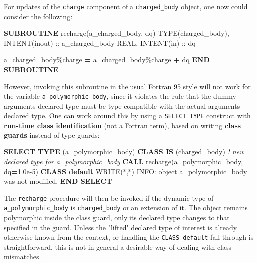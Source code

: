 \documentclass[
]{scrartcl}
\newenvironment{Shaded}{}{}
\newcommand{\CommentTok}[1]{\textcolor[rgb]{0.38,0.63,0.69}{\textit{#1}}}
\newcommand{\DataTypeTok}[1]{\textcolor[rgb]{0.56,0.13,0.00}{#1}}
\newcommand{\FloatTok}[1]{\textcolor[rgb]{0.25,0.63,0.44}{#1}}
\newcommand{\FunctionTok}[1]{\textcolor[rgb]{0.02,0.16,0.49}{#1}}
\newcommand{\KeywordTok}[1]{\textcolor[rgb]{0.00,0.44,0.13}{\textbf{#1}}}
\newcommand{\NormalTok}[1]{#1}
\newcommand{\OperatorTok}[1]{\textcolor[rgb]{0.40,0.40,0.40}{#1}}
\newcommand{\StringTok}[1]{\textcolor[rgb]{0.25,0.44,0.63}{#1}}
\begin{document}
For updates of the \texttt{charge} component of a \texttt{charged\_body}
object, one now could consider the following:

\begin{Shaded}
\begin{Highlighting}[]
\KeywordTok{SUBROUTINE}\NormalTok{ recharge(a\_charged\_body, dq)}
   \DataTypeTok{TYPE(charged\_body)}\NormalTok{, }\DataTypeTok{INTENT(inout)} \DataTypeTok{::}\NormalTok{ a\_charged\_body}
   \DataTypeTok{REAL}\NormalTok{, }\DataTypeTok{INTENT(in)} \DataTypeTok{::}\NormalTok{ dq}

\NormalTok{   a\_charged\_body}\OperatorTok{\%}\NormalTok{charge }\KeywordTok{=}\NormalTok{ a\_charged\_body}\OperatorTok{\%}\NormalTok{charge }\KeywordTok{+}\NormalTok{ dq}
\KeywordTok{END SUBROUTINE}
\end{Highlighting}
\end{Shaded}

However, invoking this subroutine in the usual Fortran 95 style will not
work for the variable \texttt{a\_polymorphic\_body}, since it violates
the rule that the dummy argument\textquotesingle s declared type must be
type compatible with the actual argument\textquotesingle s declared
type. One can work around this by using a \texttt{SELECT\ TYPE}
construct with \textbf{run-time class identification} (not a Fortran
term), based on writing \textbf{class guards} instead of type guards:

\begin{Shaded}
\begin{Highlighting}[]
\KeywordTok{SELECT TYPE}\NormalTok{ (a\_polymorphic\_body)}
\KeywordTok{CLASS IS}\NormalTok{ (charged\_body)  }\CommentTok{! new declared type for a\_polymorphic\_body}
   \KeywordTok{CALL}\NormalTok{ recharge(a\_polymorphic\_body, dq}\KeywordTok{=}\FloatTok{1.0e{-}5}\NormalTok{)}
\KeywordTok{CLASS default}
   \FunctionTok{WRITE(*}\NormalTok{,}\FunctionTok{*)} \StringTok{\textquotesingle{}INFO: object a\_polymorphic\_body was not modified.\textquotesingle{}}
\KeywordTok{END SELECT}
\end{Highlighting}
\end{Shaded}

The \texttt{recharge} procedure will then be invoked if the dynamic type
of \texttt{a\_polymorphic\_body} is \texttt{charged\_body} or an
extension of it. The object remains polymorphic inside the class guard,
only its declared type changes to that specified in the guard. Unless
the "lifted" declared type of interest is already otherwise known from
the context, or handling the \texttt{CLASS\ default} fall-through is
straightforward, this is not in general a desirable way of dealing with
class mismatches.
\end{document}
